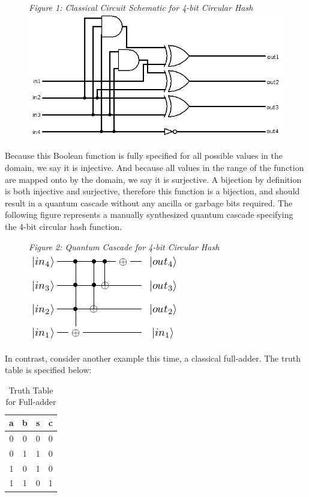 \documentclass{IEEEtran}
\begin{document}
\begin{figure}[h!]
\begin{center}
\textit{\small{Figure 1: Classical Circuit Schematic for 4-bit Circular Hash}}
  \includegraphics[scale=0.35]{figures/fbch.png}
\end{center}
\end{figure}

Because this Boolean function is fully specified for all possible values in the domain, we say it is injective. And because all values in the range of the function are mapped onto by the domain, we say it is surjective. A bijection by definition is both injective and surjective, therefore this function is a bijection, and should result in a quantum cascade without any ancilla or garbage bits required. The following figure represents a manually synthesized quantum cascade specifying the 4-bit circular hash function. 

\begin{figure}[h!]
\begin{center}
\textit{\small{Figure 2: Quantum Cascade for 4-bit Circular Hash}} 
  \includegraphics[scale=0.6]{figures/4-bit_circular_hash_qc.png}
\end{center}
\end{figure}

In contrast, consider another example this time, a classical full-adder. The truth table is specified below: 

\begin{table}[h!]
\caption{Truth Table for Full-adder}
\begin{center}
\begin{tabular}{| c  c | c  c |}
    \hline
    a&b&s&c \\
    \hline
    \hline
    0&0&0&0 \\
    0&1&1&0 \\
    1&0&1&0 \\
    1&1&0&1 \\ 
    \hline
\end{tabular}
\end{center}

\end{table}
\end{document}
